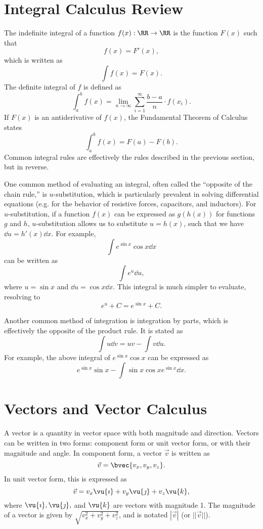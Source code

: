 \documentclass[11pt]{article}
\begin{document}
\section{Integral Calculus Review}
The indefinite integral of a function $f(x):\RR\to\RR$ is the function $F(x)$ such that
\begin{equation}
    f(x) = F'(x),
\end{equation}
which is written as
\begin{equation}
    \int f(x) = F(x).
\end{equation}
The definite integral of $f$ is defined as
\begin{equation}
    \int_a^b f(x) = \lim_{n \to\infty}\sum_{i=1}^{\infty} \frac{b-a}{n}\cdot f(x_i).
\end{equation}
If $F(x)$ is an antiderivative of $f(x)$, the Fundamental Theorem of Calculus states
\begin{equation}
    \int_a^b f(x) = F(a) - F(b).
\end{equation}
Common integral rules are effectively the rules described in the previous section, but in reverse.

One common method of evaluating an integral, often called the ``opposite of the chain rule,'' is $u$-substitution, which is particularly prevalent in solving differential equations (e.g. for the behavior of resistive forces, capacitors, and inductors). For $u$-substitution, if a function $f(x)$ can be expressed as $g(h(x))$ for functions $g$ and $h$, $u$-substitution allows us to substitute $u = h(x)$, such that we have $\dd u = h'(x) \dd x$. For example,
\[\int e^{\sin x}\cos x \dd x\]
can be written as
\[\int e^u\dd u,\]
where $u = \sin x$ and $\dd u = \cos x\dd x$. This integral is much simpler to evaluate, resolving to
\[e^{u} + C = e^{\sin x} + C.\]

Another common method of integration is integration by parts, which is effectively the opposite of the product rule. It is stated as
\begin{equation}
    \int u\dd v = uv - \int v\dd u.
\end{equation}
For example, the above integral of $e^{\sin x} \cos x$ can be expressed as
\[e^{\sin x}\sin x - \int \sin x\cos x e^{\sin x} \dd x.\]

\section{Vectors and Vector Calculus}
A vector is a quantity in vector space with both magnitude and direction. Vectors can be written in two forms: component form or unit vector form, or with their magnitude and angle. In component form, a vector $\vec{v}$ is written as \[\vec{v} = \bvec{v_x, v_y, v_z}.\] In unit vector form, this is expressed as \[\vec{v} = v_x\vu{\imath} + v_y\vu{\jmath} + v_z\vu{k},\] where $\vu{\imath}, \vu{\jmath},$ and $\vu{k}$ are vectors with magnitude 1.  The magnitude of a vector is given by $\sqrt{v_x^2+v_y^2+v_z^2}$, and is notated $|\vec{v}|$ (or $||\vec{v}||$).
\end{document}

